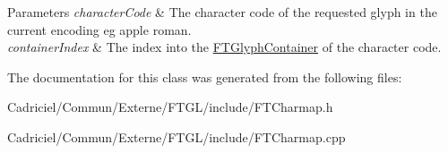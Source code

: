 \begin{DoxyParams}{Parameters}
{\em character\+Code} & The character code of the requested glyph in the current encoding eg apple roman. \\
\hline
{\em container\+Index} & The index into the \hyperlink{class_f_t_glyph_container}{F\+T\+Glyph\+Container} of the character code. \\
\hline
\end{DoxyParams}


The documentation for this class was generated from the following files\+:\begin{DoxyCompactItemize}
\item 
Cadriciel/\+Commun/\+Externe/\+F\+T\+G\+L/include/F\+T\+Charmap.\+h\item 
Cadriciel/\+Commun/\+Externe/\+F\+T\+G\+L/include/F\+T\+Charmap.\+cpp\end{DoxyCompactItemize}
